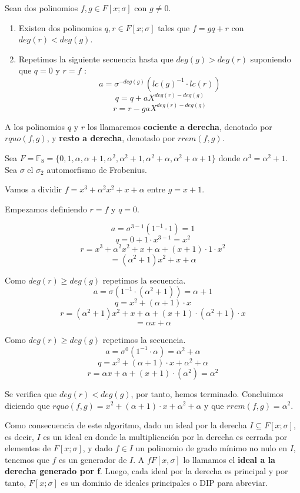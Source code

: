 \begin{theorem}
    Sean dos polinomios $f,g \in F[x;\sigma]$ con $g \neq 0$.
    \begin{enumerate}
        \item Existen dos polinomios $q,r \in F[x;\sigma]$ tales que $f = gq + r$ con $deg(r) < deg(g)$.
        \item Repetimos la siguiente secuencia hasta que $deg(g) > deg(r)$ suponiendo que $q=0$ y $r=f$ :
            \[ a = \sigma^{-deg(g)}(lc(g)^{-1}\cdot lc(r))\]
            \[ q = q + aX^{deg(r)-deg(g)}\]
            \[ r = r - gaX^{deg(r)-deg(g)}\]
    \end{enumerate}
\end{theorem}

A los polinomios $q$ y $r$ los llamaremos \textbf{cociente a derecha}, denotado por $rquo(f,g)$, y \textbf{resto a derecha}, denotado por $rrem(f,g)$.

\begin{exampleth}
\label{ex:division_torcida}
    Sea $F = \mathbb{F}_{8} = \{ 0,1,\alpha,\alpha+1, \alpha^2, \alpha^2 +1,\alpha^2 + \alpha, \alpha^2 + \alpha + 1 \}$ donde $\alpha^3 = \alpha^2 + 1$. Sea $\sigma$ el $\sigma_2$ automorfismo de Frobenius.

Vamos a dividir $f= x^3 + \alpha^2 x^2 + x +\alpha$ entre $g = x + 1$.

Empezamos definiendo $r=f$ y $q=0$.

\[ a = \sigma^{3-1}(1^{-1} \cdot 1) = 1 \]
\[ q = 0 + 1 \cdot x^{3-1} = x^2\]
\[ r = x^3 + \alpha^2 x^2 + x +\alpha +  (x+1) \cdot 1 \cdot x^2 \] 
\[ = (\alpha^2 +1)x^2 + x + \alpha\]

Como $deg(r) \geq deg(g)$ repetimos la secuencia.
\[ a = \sigma(1^{-1} \cdot (\alpha^2 +1) ) = \alpha + 1\]
\[ q = x^2 + (\alpha +1) \cdot x \]
\[ r = (\alpha^2 +1)x^2 + x + \alpha + (x+1) \cdot (\alpha^2 +1) \cdot x  \] 
\[= \alpha x + \alpha\]

Como $deg(r) \geq deg(g)$ repetimos la secuencia.
\[ a =  \sigma^{0}(1^{-1} \cdot \alpha) = \alpha^2 + \alpha \]
\[ q = x^2 + (\alpha +1) \cdot x + \alpha^2 + \alpha\]
\[ r = \alpha x + \alpha + (x+1) \cdot (\alpha^2) = \alpha^2 \]

Se verifica que $deg(r) < deg(g)$, por tanto, hemos terminado. Concluimos diciendo que $rquo(f,g) =x^2 + (\alpha +1) \cdot x + \alpha^2 + \alpha $ y que $rrem(f,g) = \alpha^2$.
\end{exampleth}

Como consecuencia de este algoritmo, dado un ideal por la derecha $I \subseteq F[x;\sigma]$, es decir, $I$ es un ideal en donde la multiplicación por la derecha es cerrada por elementos de $F[x;\sigma]$, y dado $f \in I$ un polinomio de grado mínimo no nulo en $I$, tenemos que $f$ es un generador de $I$. A $fF[x,\sigma]$ lo llamamos el \textbf{ideal a la derecha generado por f}. Luego, cada ideal por la derecha es principal y por tanto, $F[x;\sigma]$ es un dominio de ideales principales o DIP para abreviar.

